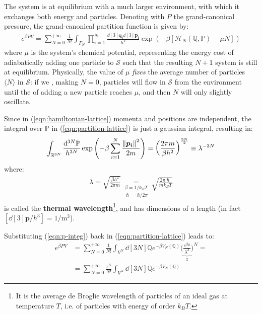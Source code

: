 \documentclass[../template.tex]{subfiles}
\begin{document}
The system is at equilibrium with a much larger environment, with which it exchanges both energy and particles. Denoting with $P$ the grand-canonical pressure, the grand-canonical partition function is given by:
\begin{align}\label{eqn:partition-lattice}
    e^{\beta P V} = \sum_{N=0}^{+\infty} \frac{1}{N!} \int_{\Gamma_N} \prod_{i=1}^N \frac{\dd[3]{\bm{q_i}} \dd[3]{\bm{p_i}}}{h^3} \exp(-\beta[ \mathcal{H}_N(\mathbb{Q}, \mathbb{P}) - \mu N])  
\end{align}
where $\mu$ is the system's chemical potential, representing the energy cost of adiabatically adding one particle to $\mathcal{S}$ such that the resulting $N+1$ system is still at equilibrium. Physically, the value of $\mu$ \textit{fixes} the average number of particles $\langle N \rangle$ in $\mathcal{S}$: if we , making $N=0$, particles will flow in $\mathcal{S}$ from the environment until the  of adding a new particle reaches $\mu$, and then $N$ will only slightly oscillate.

\medskip

Since in (\ref{eqn:hamiltonian-lattice}) momenta and positions are independent, the integral over $\mathbb{P}$ in (\ref{eqn:partition-lattice}) is just a gaussian integral, resulting in:
\begin{align}\label{eqn:p-integ}
    \int_{\mathbb{R}^{3N}} \frac{\dd[3N]{\mathbb{P}}}{h^{3N}} \exp\left(-\beta\sum_{i=1}^N \frac{\norm{\bm{p_i}}^2}{2m} \right) = \left(\frac{2\pi m}{\beta h^2} \right)^{\frac{3N}{2}} \equiv \lambda^{-3N}
\end{align}
where:
\begin{align*}
    \lambda=\sqrt{\frac{\beta h^2}{2 \pi m}} \underset{\substack{\beta = 1/k_B T\\\hslash = h/2 \pi}}{=} \sqrt{\frac{2 \pi \hslash}{m k_B T}}
\end{align*}
is called the \textbf{thermal wavelength}\footnote{It is the average de Broglie wavelength of particles of an ideal gas at temperature $T$, i.e. of particles with energy of order $k_B T$.}, and has dimensions of a length (in fact $[\dd[3]{\bm{p}}/h^3] = 1/\si{\m^3}$). 

\medskip

Substituting (\ref{eqn:p-integ}) back in (\ref{eqn:partition-lattice}) leads to:
\begin{align}\nonumber
    e^{\beta P V} &= \sum_{N=0}^{+\infty} \frac{1}{N!} \int_{V^N} \dd[3N]{\mathbb{Q}} e^{-\beta V_N(\mathbb{Q})} \Bigg(\underbrace{\frac{e^{\beta \mu }}{\lambda^3}}_{z} \Bigg)^N =\\
    &= \sum_{N=0}^{+\infty}  \frac{z^N}{N!} \int_{V^N} \dd[3N]{\mathbb{Q}} e^{-\beta V_N(\mathbb{Q})}   \label{eqn:part-func}
\end{align}
\end{document}
